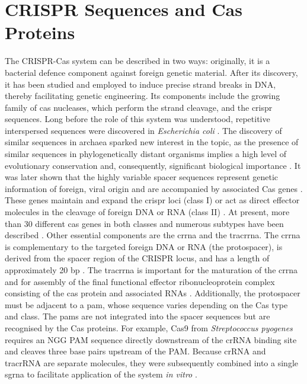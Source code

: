 \section{CRISPR Sequences and Cas Proteins}
The CRISPR-Cas system can be described in two ways: originally, it is a bacterial defence component against foreign genetic material. After its discovery, it has been studied and employed to induce precise strand breaks in DNA, thereby facilitating genetic engineering. Its components include the growing family of \ac{cas} nucleases, which perform the strand cleavage, and the \ac{crispr} sequences. Long before the role of this system was understood, repetitive interspersed sequences were discovered in \textit{Escherichia coli} \cite{ishinoNucleotideSequenceIap1987}. The discovery of similar sequences in archaea sparked new interest in the topic, as the presence of similar sequences in phylogenetically distant organisms implies a high level of evolutionary conservation and, consequently, significant biological importance \cite{Si2005}. It was later shown that the highly variable spacer sequences represent genetic information of foreign, viral origin \cite{pourcelCRISPRElementsYersinia2005,bolotinClusteredRegularlyInterspaced2005} and are accompanied by associated Cas genes \cite{jansenIdentificationGenesThat2002}. These genes maintain and expand the \ac{crispr} loci (class I) or act as direct effector molecules in the cleavage of foreign DNA or RNA (class II) \cite{shmakovSystematicPredictionGenes2018}. At present, more than 30 different \ac{cas} genes in both classes and numerous subtypes have been described \cite{makarovaEvolutionaryClassificationCRISPR2020}. Other essential components are the \ac{crrna} and the \ac{tracrrna}. The \ac{crrna} is complementary to the targeted foreign DNA or RNA (the protospacer), is derived from the spacer region of the CRISPR locus, and has a length of approximately 20 bp \cite{brounsSmallCRISPRRNAs2008}. The \ac{tracrrna} is important for the maturation of the \ac{crrna} and for assembly of the final functional effector ribonucleoprotein complex consisting of the \ac{cas} protein and associated RNAs \cite{deltchevaCRISPRRNAMaturation2011}. Additionally, the protospacer must be adjacent to a \ac{pam}, whose sequence varies depending on the Cas type and class. The \acp{pam} are not integrated into the spacer sequences but are recognised by the Cas proteins. For example, Cas9 from \textit{Streptococcus pyogenes} requires an NGG PAM sequence directly downstream of the crRNA binding site and cleaves three base pairs upstream of the PAM. Because crRNA and tracrRNA are separate molecules, they were subsequently combined into a single \ac{sgrna} to facilitate application of the system \textit{in vitro} \cite{jinekProgrammableDualRNAguidedDNA2012}.

